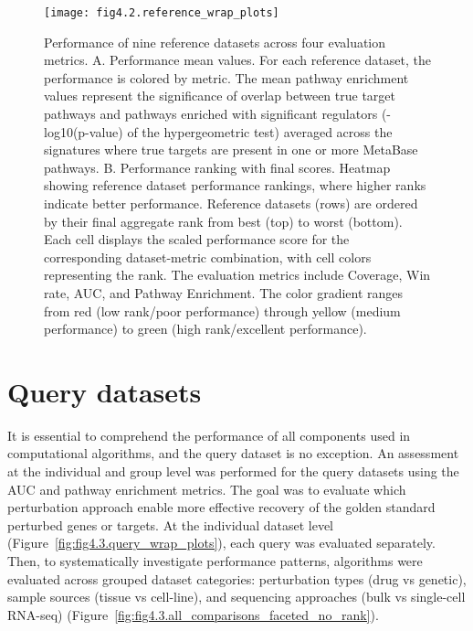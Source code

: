 \begin{figure}[htbp]
    \centering
    \texttt{[image: fig4.2.reference\_wrap\_plots]}
    \caption[Performance of nine reference datasets across four evaluation metrics.]{Performance of nine reference datasets across four evaluation metrics. A. Performance mean values. For each reference dataset, the performance is colored by metric. The mean pathway enrichment values represent the significance of overlap between true target pathways and pathways enriched with significant regulators (-log10(p-value) of the hypergeometric test) averaged across the signatures where true targets are present in one or more MetaBase pathways. B. Performance ranking with final scores. Heatmap showing reference dataset performance rankings, where higher ranks indicate better performance. Reference datasets (rows) are ordered by their final aggregate rank from best (top) to worst (bottom). Each cell displays the scaled performance score for the corresponding dataset-metric combination, with cell colors representing the rank. The evaluation metrics include Coverage, Win rate, AUC, and Pathway Enrichment. The color gradient ranges from red (low rank/poor performance) through yellow (medium performance) to green (high rank/excellent performance).}
    \label{fig:fig4.2.reference_wrap_plots}
\end{figure}



\section{Query datasets} %
\label{sec:query_datasets_results}

It is essential to comprehend the performance of all components used in computational algorithms, and the query dataset is no exception. An assessment at the individual and group level was performed for the query datasets using the AUC and pathway enrichment metrics. The goal was to evaluate which perturbation approach enable more effective recovery of the golden standard perturbed genes or targets. At the individual dataset level (Figure~\ref{fig:fig4.3.query_wrap_plots}), each query was evaluated separately. Then, to systematically investigate performance patterns, algorithms were evaluated across grouped dataset categories: perturbation types (drug vs genetic), sample sources (tissue vs cell-line), and sequencing approaches (bulk vs single-cell RNA-seq) (Figure~\ref{fig:fig4.3.all_comparisons_faceted_no_rank}).


